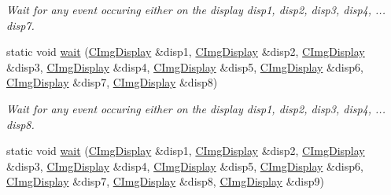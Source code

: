 \begin{DoxyCompactItemize}
\begin{DoxyCompactList}\small\item\em Wait for any event occuring either on the display {\ttfamily disp1}, {\ttfamily disp2}, {\ttfamily disp3}, {\ttfamily disp4}, ... {\ttfamily disp7}. \item\end{DoxyCompactList}\item 
\hypertarget{structcimg__library_1_1CImgDisplay_a6bf0e4fd59de6a0e60d787da8cb55b40}{
static void \hyperlink{structcimg__library_1_1CImgDisplay_a6bf0e4fd59de6a0e60d787da8cb55b40}{wait} (\hyperlink{structcimg__library_1_1CImgDisplay}{CImgDisplay} \&disp1, \hyperlink{structcimg__library_1_1CImgDisplay}{CImgDisplay} \&disp2, \hyperlink{structcimg__library_1_1CImgDisplay}{CImgDisplay} \&disp3, \hyperlink{structcimg__library_1_1CImgDisplay}{CImgDisplay} \&disp4, \hyperlink{structcimg__library_1_1CImgDisplay}{CImgDisplay} \&disp5, \hyperlink{structcimg__library_1_1CImgDisplay}{CImgDisplay} \&disp6, \hyperlink{structcimg__library_1_1CImgDisplay}{CImgDisplay} \&disp7, \hyperlink{structcimg__library_1_1CImgDisplay}{CImgDisplay} \&disp8)}
\label{structcimg__library_1_1CImgDisplay_a6bf0e4fd59de6a0e60d787da8cb55b40}

\begin{DoxyCompactList}\small\item\em Wait for any event occuring either on the display {\ttfamily disp1}, {\ttfamily disp2}, {\ttfamily disp3}, {\ttfamily disp4}, ... {\ttfamily disp8}. \item\end{DoxyCompactList}\item 
\hypertarget{structcimg__library_1_1CImgDisplay_a8af9b2ad0b81d8e22d3e09fd4e8dcf12}{
static void \hyperlink{structcimg__library_1_1CImgDisplay_a8af9b2ad0b81d8e22d3e09fd4e8dcf12}{wait} (\hyperlink{structcimg__library_1_1CImgDisplay}{CImgDisplay} \&disp1, \hyperlink{structcimg__library_1_1CImgDisplay}{CImgDisplay} \&disp2, \hyperlink{structcimg__library_1_1CImgDisplay}{CImgDisplay} \&disp3, \hyperlink{structcimg__library_1_1CImgDisplay}{CImgDisplay} \&disp4, \hyperlink{structcimg__library_1_1CImgDisplay}{CImgDisplay} \&disp5, \hyperlink{structcimg__library_1_1CImgDisplay}{CImgDisplay} \&disp6, \hyperlink{structcimg__library_1_1CImgDisplay}{CImgDisplay} \&disp7, \hyperlink{structcimg__library_1_1CImgDisplay}{CImgDisplay} \&disp8, \hyperlink{structcimg__library_1_1CImgDisplay}{CImgDisplay} \&disp9)}
\label{structcimg__library_1_1CImgDisplay_a8af9b2ad0b81d8e22d3e09fd4e8dcf12}


\end{DoxyCompactItemize}
